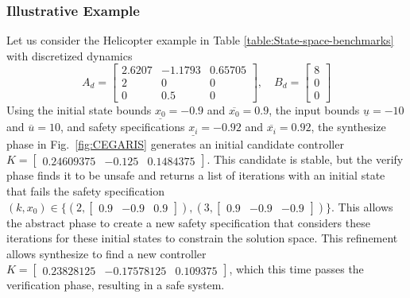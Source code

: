 \documentclass[runningheads,a4paper]{llncs}
\begin{document}
\subsubsection{Illustrative Example}
%
Let us consider the Helicopter example in Table
\ref{table:State-space-benchmarks} with discretized dynamics
%
$$A_d = \left[\begin{array}{ccc}2.6207&-1.1793&0.65705\\2&0&0\\0&0.5&0\end{array}\right],
\quad B_d = \left [\begin{array}{c}8\\0\\0\end{array}\right]$$
%
Using the initial state bounds $\underline{x_{0}}=-0.9$ and
$\overline{x_{0}}=0.9$, the input bounds $\underline{u}=-10$ and
$\overline{u}=10$, and safety specifications $\underline{x_{i}}=-0.92$ and
$\overline{x_{i}}=0.92$, the {\sc synthesize} phase in
Fig.~\ref{fig:CEGARIS} generates an initial candidate controller
$K=[\begin{array}{ccc}0.24609375&-0.125&0.1484375\end{array}]$.
This candidate is stable, but the {\sc verify} phase finds it to be
unsafe and returns a list of iterations with an initial state that
fails the safety specification {\footnotesize $(k,x_0) {\in}
\{ (2, [\begin{array}{ccc}0.9&-0.9&0.9\end{array}]),\allowbreak (3,
[\begin{array}{ccc}0.9&-0.9&-0.9\end{array}])\}$}.  This allows the {\sc
abstract} phase to create a new safety specification that considers these
iterations for these initial states to constrain the solution space.  This
refinement allows {\sc synthesize} to find a new controller {\footnotesize
$K=[\begin{array}{ccc}0.23828125&-0.17578125&0.109375\end{array}]$}, which
this time passes the verification phase, resulting in a safe system.

\end{document}
